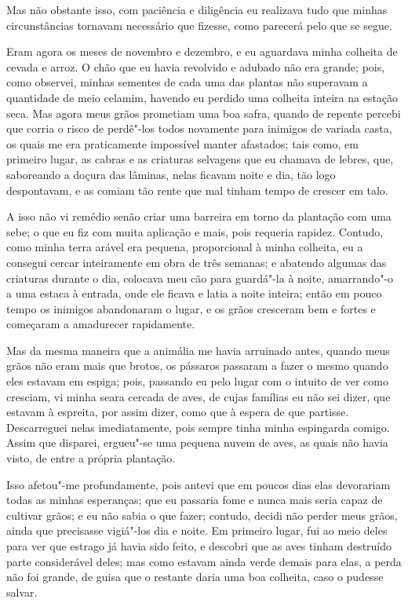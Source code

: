 Mas não obstante isso, com paciência e diligência eu realizava tudo que
minhas circunstâncias tornavam necessário que fizesse, como parecerá
pelo que se segue.

Eram agora os meses de novembro e dezembro, e eu aguardava minha
colheita de cevada e arroz. O chão que eu havia revolvido e adubado não
era grande; pois, como observei, minhas sementes de cada uma das plantas
não superavam a quantidade de meio celamim, havendo eu perdido uma
colheita inteira na estação seca. Mas agora meus grãos prometiam uma boa
safra, quando de repente percebi que corria o risco de perdê"-los todos
novamente para inimigos de variada casta, os quais me era praticamente
impossível manter afastados; tais como, em primeiro lugar, as cabras e
as criaturas selvagens que eu chamava de lebres, que, saboreando a
doçura das lâminas, nelas ficavam noite e dia, tão logo despontavam, e
as comiam tão rente que mal tinham tempo de crescer em talo.

A isso não vi remédio senão criar uma barreira em torno da plantação com
uma sebe; o que eu fiz com muita aplicação e mais, pois requeria
rapidez. Contudo, como minha terra arável era pequena, proporcional à
minha colheita, eu a consegui cercar inteiramente em obra de três
semanas; e abatendo algumas das criaturas durante o dia, colocava meu
cão para guardá"-la à noite, amarrando"-o a uma estaca à entrada, onde ele
ficava e latia a noite inteira; então em pouco tempo os inimigos
abandonaram o lugar, e os grãos cresceram bem e fortes e começaram a
amadurecer rapidamente.

Mas da mesma maneira que a animália me havia arruinado antes, quando
meus grãos não eram mais que brotos, os pássaros passaram a fazer o
mesmo quando eles estavam em espiga; pois, passando eu pelo lugar com o
intuito de ver como cresciam, vi minha seara cercada de aves, de cujas
famílias eu não sei dizer, que estavam à espreita, por assim dizer, como
que à espera de que partisse. Descarreguei nelas imediatamente, pois
sempre tinha minha espingarda comigo. Assim que disparei, ergueu"-se uma
pequena nuvem de aves, as quais não havia visto, de entre a própria
plantação.

Isso afetou"-me profundamente, pois antevi que em poucos dias elas
devorariam todas as minhas esperanças; que eu passaria fome e nunca mais
seria capaz de cultivar grãos; e eu não sabia o que fazer; contudo,
decidi não perder meus grãos, ainda que precisasse vigiá"-los dia e
noite. Em primeiro lugar, fui ao meio deles para ver que estrago já
havia sido feito, e descobri que as aves tinham destruído parte
considerável deles; mas como estavam ainda verde demais para elas, a
perda não foi grande, de guisa que o restante daria uma boa colheita,
caso o pudesse salvar.

